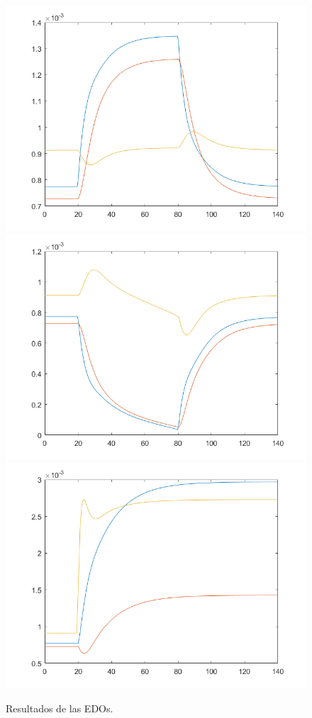 \begin{figure}[h!]
\includegraphics[scale=0.3]{../a3.png}\hspace{0.01cm}
\includegraphics[scale=0.3]{../b3.png}\hspace{0.01cm}
\includegraphics[scale=0.3]{../c3.png}
\caption{Resultados de las EDOs.}
\label{circnpnmaxout}
\end{figure}

